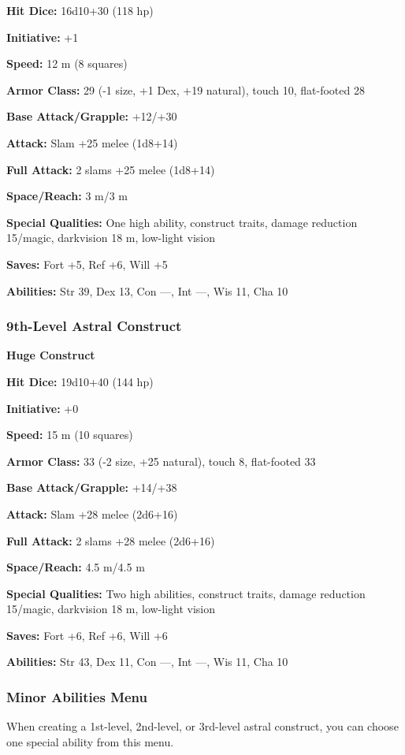 {\begin{MonsterMiniStats}
	\textbf{Hit Dice:} 16d10+30 (118 hp)

	\textbf{Initiative:} +1

	\textbf{Speed:} 12 m (8 squares)

	\textbf{Armor Class:} 29 (-1 size, +1 Dex, +19 natural), touch 10, flat-footed 28

	\textbf{Base Attack/Grapple:} +12/+30

	\textbf{Attack:} Slam +25 melee (1d8+14)

	\textbf{Full Attack:} 2 slams +25 melee (1d8+14)

	\textbf{Space/Reach:} 3 m/3 m

	\textbf{Special Qualities:} One high ability, construct traits, damage reduction 15/magic, darkvision 18 m, low-light vision

	\textbf{Saves:} Fort +5, Ref +6, Will +5

	\textbf{Abilities:} Str 39, Dex 13, Con ---, Int ---, Wis 11, Cha 10
	\end{MonsterMiniStats}

\subsubsection{9th-Level Astral Construct}
	\begin{MonsterMiniStats}
	\textbf{Huge Construct}

	\textbf{Hit Dice:} 19d10+40 (144 hp)

	\textbf{Initiative:} +0

	\textbf{Speed:} 15 m (10 squares)

	\textbf{Armor Class:} 33 (-2 size, +25 natural), touch 8, flat-footed 33

	\textbf{Base Attack/Grapple:} +14/+38

	\textbf{Attack:} Slam +28 melee (2d6+16)

	\textbf{Full Attack:} 2 slams +28 melee (2d6+16)

	\textbf{Space/Reach:} 4.5 m/4.5 m

	\textbf{Special Qualities:} Two high abilities, construct traits, damage reduction 15/magic, darkvision 18 m, low-light vision

	\textbf{Saves:} Fort +6, Ref +6, Will +6

	\textbf{Abilities:} Str 43, Dex 11, Con ---, Int ---, Wis 11, Cha 10
	\end{MonsterMiniStats}

\subsubsection{Minor Abilities Menu}
	When creating a 1st-level, 2nd-level, or 3rd-level astral construct, you can choose one special ability from this menu. 

}

